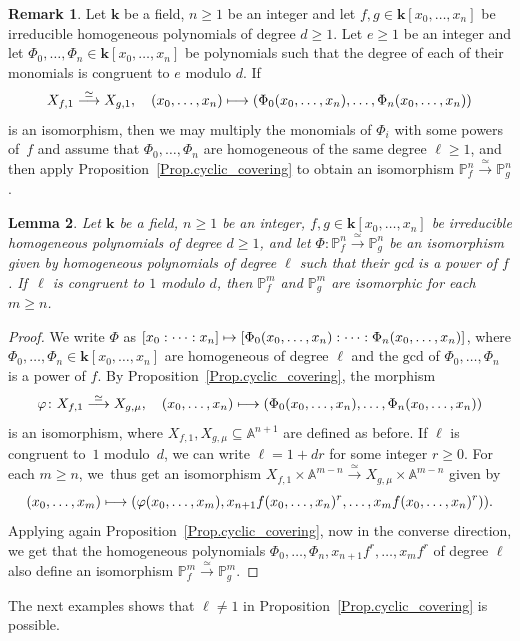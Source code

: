 \documentclass[JEP,XML,SOM,Unicode,NoFloatCountersInSection,published]{cedram}
\newcommand\mto{\mathchoice{\longmapsto}{\mapsto}{\mapsto}{\mapsto}}
\newtheorem{lemma}{Lemma}[section]
\theoremstyle{definition}
\newtheorem{remark}[lemma]{Remark}
\newcommand\iso{\stackrel{\simeq}{\longrightarrow}}
\newcommand\A{{\mathbb A}}\let\AA\A
\renewcommand\k{{\mathbf k}}
\newcommand\p{{\mathbb P}}\let\PP\p
\newcommand{\kk}{\mathbf{k}}
\begin{document}
\begin{remark}\label{remark:Replacemodulo}
Let $\kk$ be a field, $n \geq 1$ be an integer and let $f,g\in \k[x_0,\ldots,x_n]$ be irreducible homogeneous polynomials of degree $d \ge 1$. Let $e \ge 1$ be an integer and let $\Phi_0,\ldots,\Phi_n\in \k[x_0,\ldots,x_n]$ be polynomials such that the degree of each of their monomials is congruent to $e$ modulo $d$. If
\[
X_{f, 1} \iso X_{g, 1}, \quad (x_0,\ldots,x_n)\mto (\Phi_0(x_0,\ldots,x_n),\ldots, \Phi_n(x_0,\ldots,x_n))
\]
is an isomorphism, then we may multiply the monomials of $\Phi_i$ with some powers of~$f$ and assume that $\Phi_0,\ldots,\Phi_n$ are homogeneous of the same degree $\ell \geq 1$, and then apply Proposition~\ref{Prop.cyclic_covering} to obtain an isomorphism $\p^n_f\iso \p^n_g$.
\end{remark}

\begin{lemma} \label{lemma:Replace_n_by_m}
Let $\kk$ be a field, $n \geq 1$ be an integer, $f,g\in \k[x_0,\ldots,x_n]$ be irreducible homogeneous polynomials of degree $d \ge 1$, and let $\Phi\colon \p^n_f \iso \p^n_g$ be an isomorphism given by homogeneous polynomials of degree $\ell$ such that their gcd is a power of $f$.
If~$\ell$ is congruent to $1$ modulo $d$, then $\p^{m}_f$ and $\p^{m}_g$ are isomorphic for each $m\ge n$.
\end{lemma}

\begin{proof}
We write $\Phi$ as $[x_0:\cdots:x_n] \mto [\Phi_0(x_0,\ldots,x_n):\cdots: \Phi_n(x_0,\ldots,x_n)]$, where $\Phi_0,\ldots,\Phi_n\in \k[x_0,\ldots,x_n]$ are homogeneous of degree $\ell$ and the $\mathrm{gcd}$ of $\Phi_0,\ldots,\Phi_ n$ is a power of $f$. By Proposition~\ref{Prop.cyclic_covering}, the morphism
\[
\varphi\colon X_{f,1} \iso X_{g,\mu}, \quad (x_0,\ldots,x_n) \mto (\Phi_0(x_0,\ldots,x_n),\ldots, \Phi_n(x_0,\ldots,x_n))
\]
is an isomorphism, where $X_{f,1}, X_{g,\mu}\subseteq \A^{n+1}$ are defined as before. If $\ell$ is congruent to~$1$ modulo~$d$, we can write $\ell=1+dr$ for some integer $r\ge 0$. For each $m\ge n$,
we~thus get an isomorphism
$X_{f,1}\times \A^{m-n}\iso X_{g,\mu}\times \A^{m-n}$ given by
\[
(x_0,\ldots,x_m) \mto (\varphi(x_0,\ldots,x_m), x_{n+1}f(x_0,\ldots,x_n)^r,\ldots, x_m f(x_0,\ldots,x_n)^r)).
\]
Applying again Proposition~\ref{Prop.cyclic_covering}, now in the converse direction, we get that the homogeneous polynomials $\Phi_0,\ldots,\Phi_n, x_{n+1} f^r,\ldots,x_m f^r$ of degree $\ell$ also define an isomorphism $\p^{m}_f\iso\p^{m}_g$.
\end{proof}
The next examples shows that $\ell\neq 1$ in Proposition~\ref{Prop.cyclic_covering}
is possible.
\end{document}
